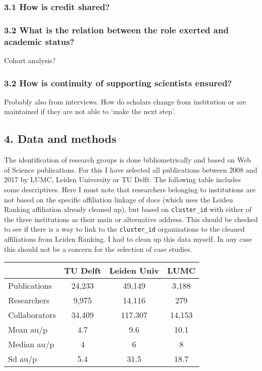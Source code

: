 \documentclass[]{article}
\begin{document}
\hypertarget{how-is-credit-shared}{%
\subsubsection{3.1 How is credit shared?}\label{how-is-credit-shared}}

\hypertarget{what-is-the-relation-between-the-role-exerted-and-academic-status}{%
\subsubsection{3.2 What is the relation between the role exerted and
academic
status?}\label{what-is-the-relation-between-the-role-exerted-and-academic-status}}

Cohort analysis?

\hypertarget{how-is-continuity-of-supporting-scientists-ensured}{%
\subsubsection{3.2 How is continuity of supporting scientists
ensured?}\label{how-is-continuity-of-supporting-scientists-ensured}}

Probably also from interviews. How do scholars change from institution
or are maintained if they are not able to `make the next step'.

\hypertarget{data-and-methods}{%
\subsection{4. Data and methods}\label{data-and-methods}}

The identification of research groups is done bibliometrically and based
on Web of Science publications. For this I have selected all
publications between 2008 and 2017 by LUMC, Leiden University or TU
Delft. The following table includes some descriptives. Here I must note
that researchers belonging to institutions are not based on the specific
affiliation linkage of docs (which uses the Leiden Ranking affiliation
already cleaned up), but based on \texttt{cluster\_id} with either of
the three institutions as their main or alternative address. This should
be checked to see if there is a way to link to the \texttt{cluster\_id}
organizations to the cleaned affiliations from Leiden Ranking. I had to
clean up this data myself. In any case this should not be a concern for
the selection of case studies.

\begin{longtable}[]{@{}lccc@{}}
\toprule
& TU Delft & Leiden Univ & LUMC\tabularnewline
\midrule
\endhead
Publications & 24,233 & 49,149 & 3,188\tabularnewline
Researchers & 9,975 & 14,116 & 279\tabularnewline
Collaborators & 34,409 & 117,307 & 14,153\tabularnewline
Mean au/p & 4.7 & 9.6 & 10.1\tabularnewline
Median au/p & 4 & 6 & 8\tabularnewline
Sd au/p & 5.4 & 31.5 & 18.7\tabularnewline
\bottomrule
\end{longtable}
\end{document}
